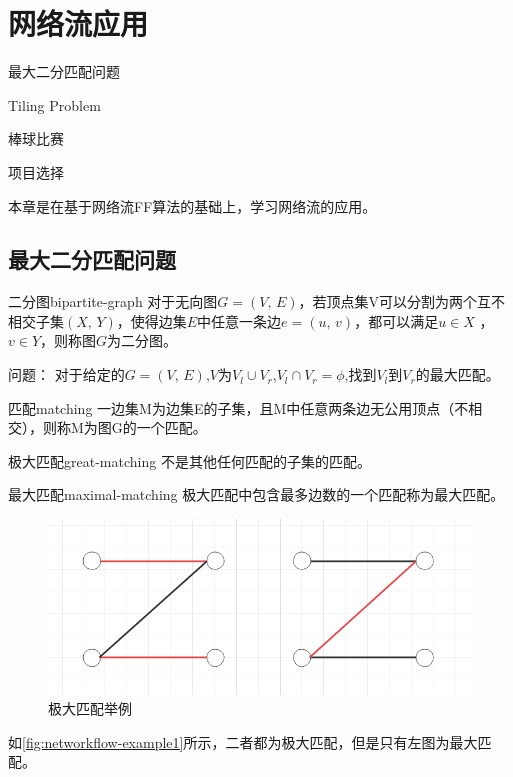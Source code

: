 \chapter{网络流应用}

\begin{introduction}
	\item 最大二分匹配问题
	\item Tiling Problem
	\item 棒球比赛
	\item 项目选择
\end{introduction}

本章是在基于网络流FF算法的基础上，学习网络流的应用。

\section{最大二分匹配问题}

\begin{definition}{二分图}{bipartite-graph}
	对于无向图\(G = (V,\,E)\)，若顶点集V可以分割为两个互不相交子集\((X,\,Y)\)，使得边集\(E\)中任意一条边\(e = (u,\,v)\)，都可以满足\(u \in X\) ，\(v \in Y\)，则称图\(G\)为二分图。
\end{definition}

问题： 对于给定的\(G = (V,\,E)\),\(V\)为\(V_l \cup V_r\),\(V_l \cap V_r = \phi \),找到\(V_l\)到\(V_r\)的最大匹配。

\begin{definition}{匹配}{matching}
	一边集M为边集E的子集，且M中任意两条边无公用顶点（不相交），则称M为图G的一个匹配。
\end{definition}

\begin{definition}{极大匹配}{great-matching}
	不是其他任何匹配的子集的匹配。
\end{definition}

\begin{definition}{最大匹配}{maximal-matching}
	极大匹配中包含最多边数的一个匹配称为最大匹配。
\end{definition}

\begin{figure}[htb]
	\centering
	\includegraphics[scale=0.6]{image/networkflow1.png}
	\caption{极大匹配举例}\label{fig:networkflow-example1}
\end{figure}
如\autoref{fig:networkflow-example1}所示，二者都为极大匹配，但是只有左图为最大匹配。

